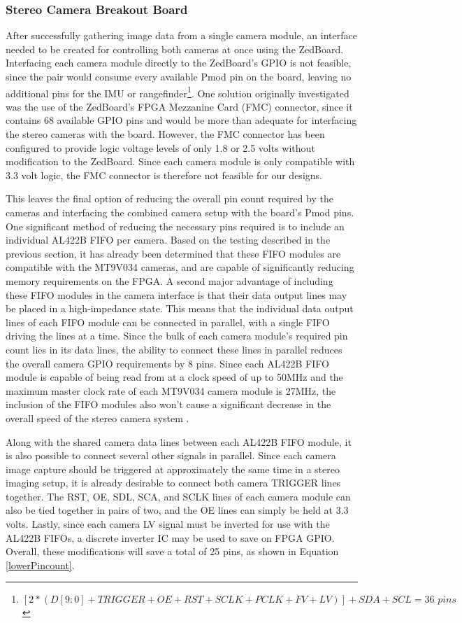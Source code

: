 \subsubsection{Stereo Camera Breakout Board}
After successfully gathering image data from a single camera module, an interface needed to be created for controlling both cameras at once using the ZedBoard. Interfacing each camera module directly to the ZedBoard's GPIO is not feasible, since the pair would consume every available Pmod pin on the board, leaving no additional pins for the IMU or rangefinder\footnote{$[2*(D[9:0]+TRIGGER+OE+RST+SCLK+PCLK+FV+LV)]+SDA+SCL = 36\,\,pins$}. One solution originally investigated was the use of the ZedBoard's FPGA Mezzanine Card (FMC) connector, since it contains 68 available GPIO pins and would be more than adequate for interfacing the stereo cameras with the board. However, the FMC connector has been configured to provide logic voltage levels of only 1.8 or 2.5 volts without modification to the ZedBoard. Since each camera module is only compatible with 3.3 volt logic, the FMC connector is therefore not feasible for our designs.
\par
This leaves the final option of reducing the overall pin count required by the cameras and interfacing the combined camera setup with the board's Pmod pins. One significant method of reducing the necessary pins required is to include an individual AL422B FIFO per camera. Based on the testing described in the previous section, it has already been determined that these FIFO modules are compatible with the MT9V034 cameras, and are capable of significantly reducing memory requirements on the FPGA. A second major advantage of including these FIFO modules in the camera interface is that their data output lines may be placed in a high-impedance state. This means that the individual data output lines of each FIFO module can be connected in parallel, with a single FIFO driving the lines at a time. Since the bulk of each camera module's required pin count lies in its data lines, the ability to connect these lines in parallel reduces the overall camera GPIO requirements by 8 pins. Since each AL422B FIFO module is capable of being read from at a clock speed of up to 50MHz and the maximum master clock rate of each MT9V034 camera module is 27MHz, the inclusion of the FIFO modules also won't cause a significant decrease in the overall speed of the stereo camera system \cite{al422b,mt9v034}.
\par
Along with the shared camera data lines between each AL422B FIFO module, it is also possible to connect several other signals in parallel. Since each camera image capture should be triggered at approximately the same time in a stereo imaging setup, it is already desirable to connect both camera TRIGGER lines together. The RST, OE, SDL, SCA, and SCLK lines of each camera module can also be tied together in pairs of two, and the OE lines can simply be held at 3.3 volts. Lastly, since each camera LV signal must be inverted for use with the AL422B FIFOs, a discrete inverter IC may be used to save on FPGA GPIO. Overall, these modifications will save a total of 25 pins, as shown in Equation \ref{lowerPincount}.
